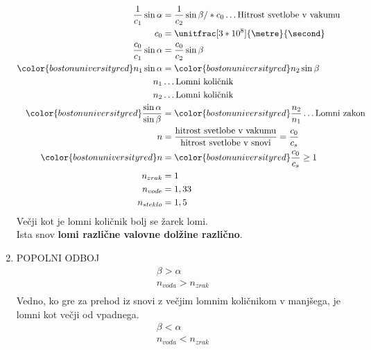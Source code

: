 \begin{enumerate}
		\begin{align*}
			\frac{1}{c_1}\sin\alpha &= \frac{1}{c_2}\sin\beta /*c_0 \dots \text{Hitrost svetlobe v vakumu}\\
			c_0 &= \unitfrac[3*10^8]{\metre}{\second}\\
			\frac{c_0}{c_1}\sin\alpha &= \frac{c_0}{c_2}\sin\beta\\
			{\color{bostonuniversityred}n_1 \sin\alpha} &= {\color{bostonuniversityred}n_2 \sin\beta}\\
			n_1 &\dots \text{Lomni količnik}\\
			n_2 &\dots \text{Lomni količnik}\\
			{\color{bostonuniversityred}\frac{\sin\alpha}{\sin\beta}} &= {\color{bostonuniversityred}\frac{n_2}{n_1}} \dots \text{Lomni zakon}\\
			n &= \frac{\text{hitrost svetlobe v vakumu}}{\text{hitrost svetlobe v snovi}} = \frac{c_0}{c_s}\\
			{\color{bostonuniversityred}n} &= {\color{bostonuniversityred}\frac{c_0}{c_s}} \geq 1\\
			n_{zrak} &= 1\\
			n_{vode} &= 1,33\\
			n_{steklo} &= 1,5\\
		\end{align*}
		Večji kot je lomni količnik bolj se žarek lomi.\\
		Ista snov \textbf{lomi različne valovne dolžine različno}.\\
	\item POPOLNI ODBOJ\\
		\begin{align*}
			\beta > \alpha\\
			n_{voda} > n_{zrak}\\
		\end{align*}
		Vedno, ko gre za prehod iz snovi z večjim lomnim količnikom v manjšega, je lomni kot večji od vpadnega.\\
		\begin{align*}
			\beta < \alpha\\
			n_{voda} < n_{zrak}\\
		\end{align*}
\end{enumerate}